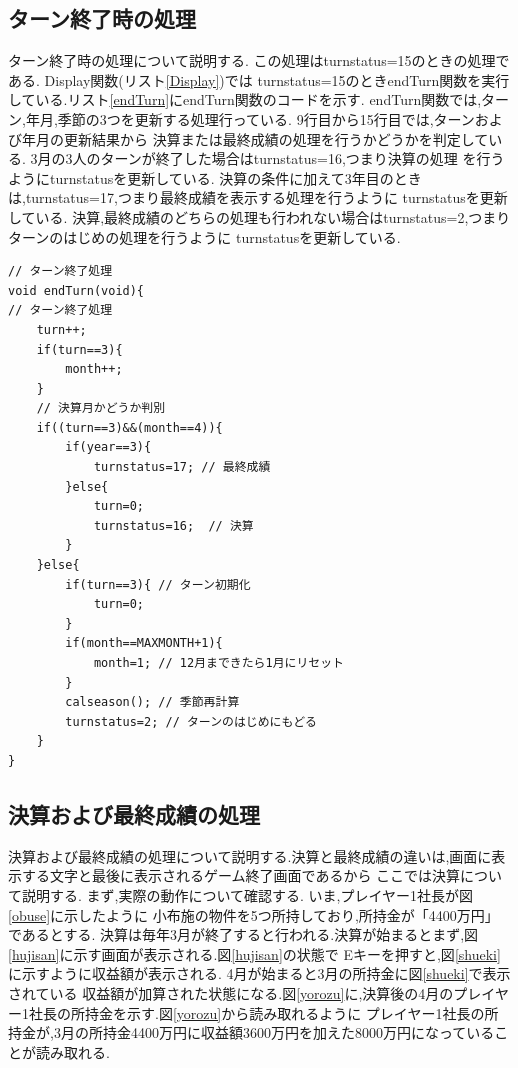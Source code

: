 \documentclass[a4j]{jarticle}
\begin{document}
    \subsection{ターン終了時の処理}
    ターン終了時の処理について説明する. この処理はturnstatus=15のときの処理である. Display関数(リスト\ref{Display})では
    turnstatus=15のときendTurn関数を実行している.リスト\ref{endTurn}にendTurn関数のコードを示す.
    endTurn関数では,ターン,年月,季節の3つを更新する処理行っている. 9行目から15行目では,ターンおよび年月の更新結果から
    決算または最終成績の処理を行うかどうかを判定している. 3月の3人のターンが終了した場合はturnstatus=16,つまり決算の処理
    を行うようにturnstatusを更新している. 決算の条件に加えて3年目のときは,turnstatus=17,つまり最終成績を表示する処理を行うように
    turnstatusを更新している. 決算,最終成績のどちらの処理も行われない場合はturnstatus=2,つまりターンのはじめの処理を行うように
    turnstatusを更新している.
    \begin{lstlisting}[basicstyle=\ttfamily\footnotesize, frame=single,label=endTurn,caption=endTurn関数]
// ターン終了処理
void endTurn(void){
// ターン終了処理
    turn++;
    if(turn==3){
        month++;
    }
    // 決算月かどうか判別
    if((turn==3)&&(month==4)){
        if(year==3){
            turnstatus=17; // 最終成績
        }else{
            turn=0;
            turnstatus=16;  // 決算
        }
    }else{
        if(turn==3){ // ターン初期化
            turn=0;
        }
        if(month==MAXMONTH+1){
            month=1; // 12月まできたら1月にリセット
        }
        calseason(); // 季節再計算
        turnstatus=2; // ターンのはじめにもどる
    }
}
    \end{lstlisting}

    \subsection{決算および最終成績の処理}
    決算および最終成績の処理について説明する.決算と最終成績の違いは,画面に表示する文字と最後に表示されるゲーム終了画面であるから
    ここでは決算について説明する. まず,実際の動作について確認する. いま,プレイヤー1社長が図\ref{obuse}に示したように
    小布施の物件を5つ所持しており,所持金が「4400万円」であるとする.
    決算は毎年3月が終了すると行われる.決算が始まるとまず,図\ref{hujisan}に示す画面が表示される.図\ref{hujisan}の状態で
    Eキーを押すと,図\ref{shueki}に示すように収益額が表示される. 4月が始まると3月の所持金に図\ref{shueki}で表示されている
    収益額が加算された状態になる.図\ref{yorozu}に,決算後の4月のプレイヤー1社長の所持金を示す.図\ref{yorozu}から読み取れるように
    プレイヤー1社長の所持金が,3月の所持金4400万円に収益額3600万円を加えた8000万円になっていることが読み取れる.
\end{document}
